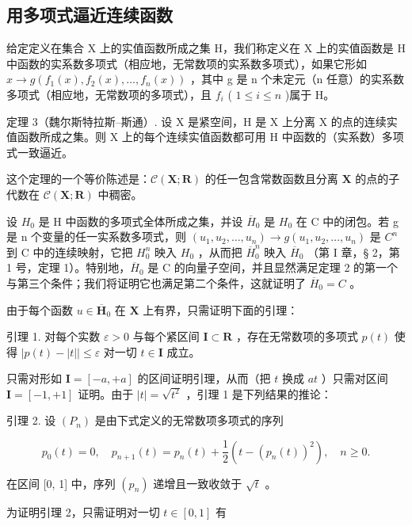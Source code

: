 \subsection{用多项式逼近连续函数}

给定定义在集合 X 上的实值函数所成之集 H，我们称定义在 X 上的实值函数是 H 中函数的实系数多项式（相应地，无常数项的实系数多项式），如果它形如 \(x \to g(f_{1}(x), f_{2}(x), \ldots, f_{n}(x))\) ，其中 g 是 n 个未定元（n 任意）的实系数多项式（相应地，无常数项的多项式），且 \(f_{i}\) ( \(1 \leqslant i \leqslant n\) )属于 H。

定理 3（魏尔斯特拉斯–斯通）. 设 X 是紧空间，H 是 X 上分离 X 的点的连续实值函数所成之集。则 X 上的每个连续实值函数都可用 H 中函数的（实系数）多项式一致逼近。

这个定理的一个等价陈述是：\(\mathcal{C}(\mathbf{X};\mathbf{R})\) 的任一包含常数函数且分离 \(\mathbf{X}\) 的点的子代数在 \(\mathcal{C}(\mathbf{X};\mathbf{R})\) 中稠密。

设 \(H_{0}\) 是 H 中函数的多项式全体所成之集，并设 \(\overline{H}_{0}\) 是 \(H_{0}\) 在 C 中的闭包。若 g 是 n 个变量的任一实系数多项式，则 \((u_{1}, u_{2}, \ldots, u_{n}) \to g(u_{1}, u_{2}, \ldots, u_{n})\) 是 \(C^{n}\) 到 C 中的连续映射，它把 \(H_{0}^{n}\) 映入 \(H_{0}\) ，从而把 \(\overline{H}_{0}^{n}\) 映入 \(\overline{H}_{0}\) （第 I 章，§ 2，第 1 号，定理 1）。特别地，\(\overline{H}_{0}\) 是 C 的向量子空间，并且显然满足定理 2 的第一个与第三个条件；我们将证明它也满足第二个条件，这就证明了 \(\overline{H}_{0} = C\) 。

由于每个函数 \(u \in \overline{\mathbf{H}}_0\) 在 \(\mathbf{X}\) 上有界，只需证明下面的引理：

引理 1. 对每个实数 \(\varepsilon > 0\) 与每个紧区间 \(\mathbf{I} \subset \mathbf{R}\) ，存在无常数项的多项式 \(p(t)\) 使得 \(|p(t) - |t|| \leqslant \varepsilon\) 对一切 \(t \in \mathbf{I}\) 成立。

只需对形如 \(\mathbf{I} = [-a, +a]\) 的区间证明引理，从而（把 \(t\) 换成 \(at\) ）只需对区间 \(\mathbf{I} = [-1, +1]\) 证明。由于 \(|t| = \sqrt{t^2}\) ，引理 1 是下列结果的推论：

引理 2. 设 \((P_n)\) 是由下式定义的无常数项多项式的序列

\[
p _ {0} (t) = 0, \quad p _ {n + 1} (t) = p _ {n} (t) + \frac {1}{2} (t - (p _ {n} (t)) ^ {2}), \quad n \geqslant 0.\tag{1}
\]

在区间 {[}0, 1{]} 中，序列 \((p_n)\) 递增且一致收敛于 \(\sqrt{t}\) 。

为证明引理 2，只需证明对一切 \(t \in [0, 1]\) 有

